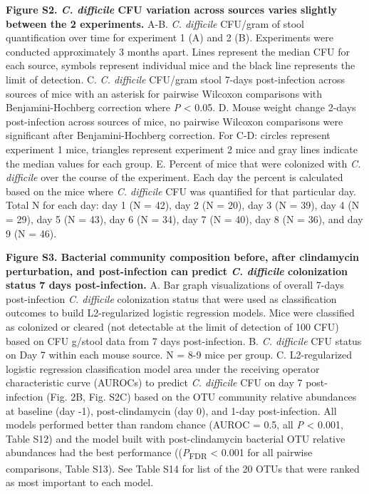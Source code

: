 \documentclass[
  11pt,
]{article}
\begin{document}
\textbf{Figure S2. \emph{C. difficile} CFU variation across sources
varies slightly between the 2 experiments.} A-B. \emph{C. difficile}
CFU/gram of stool quantification over time for experiment 1 (A) and 2
(B). Experiments were conducted approximately 3 months apart. Lines
represent the median CFU for each source, symbols represent individual
mice and the black line represents the limit of detection. C. \emph{C.
difficile} CFU/gram stool 7-days post-infection across sources of mice
with an asterisk for pairwise Wilcoxon comparisons with
Benjamini-Hochberg correction where \emph{P} \textless{} 0.05. D. Mouse
weight change 2-days post-infection across sources of mice, no pairwise
Wilcoxon comparisons were significant after Benjamini-Hochberg
correction. For C-D: circles represent experiment 1 mice, triangles
represent experiment 2 mice and gray lines indicate the median values
for each group. E. Percent of mice that were colonized with \emph{C.
difficile} over the course of the experiment. Each day the percent is
calculated based on the mice where \emph{C. difficile} CFU was
quantified for that particular day. Total N for each day: day 1 (N =
42), day 2 (N = 20), day 3 (N = 39), day 4 (N = 29), day 5 (N = 43), day
6 (N = 34), day 7 (N = 40), day 8 (N = 36), and day 9 (N = 46).

\newpage

\textbf{Figure S3. Bacterial community composition before, after
clindamycin perturbation, and post-infection can predict \emph{C.
difficile} colonization status 7 days post-infection.} A. Bar graph
visualizations of overall 7-days post-infection \emph{C. difficile}
colonization status that were used as classification outcomes to build
L2-regularized logistic regression models. Mice were classified as
colonized or cleared (not detectable at the limit of detection of 100
CFU) based on CFU g/stool data from 7 days post-infection. B. \emph{C.
difficile} CFU status on Day 7 within each mouse source. N = 8-9 mice
per group. C. L2-regularized logistic regression classification model
area under the receiving operator characteristic curve (AUROCs) to
predict \emph{C. difficile} CFU on day 7 post-infection (Fig. 2B, Fig.
S2C) based on the OTU community relative abundances at baseline (day
-1), post-clindamycin (day 0), and 1-day post-infection. All models
performed better than random chance (AUROC = 0.5, all \emph{P}
\textless{} 0.001, Table S12) and the model built with post-clindamycin
bacterial OTU relative abundances had the best performance
((\emph{P}\textsubscript{FDR} \textless{} 0.001 for all pairwise
comparisons, Table S13). See Table S14 for list of the 20 OTUs that were
ranked as most important to each model.
\end{document}
